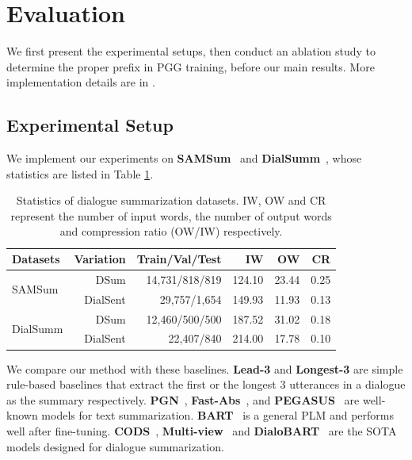 \section{Evaluation}
We first present the experimental setups, then conduct an ablation study to
determine the proper prefix in PGG training, before our main 
results. More implementation details are in .

\subsection{Experimental Setup}
We implement our experiments on \textbf{SAMSum}~\cite{gliwa2019samsum}
and  \textbf{DialSumm}~\cite{chen-etal-2021-dialogsum}, whose statistics 
are listed in Table \ref{tab:sumdataset}. 



\begin{table}[th]
	\scriptsize
	\centering
	\begin{tabular}{p{0.8cm}rrrrr}
		\toprule[1pt]
		\textbf{Datasets}& \textbf{Variation} & \textbf{Train/Val/Test} & \textbf{IW} & \textbf{OW} & \textbf{CR} \\
		\midrule[1pt]
		\multirow{2}{*}{SAMSum}& DSum & 14,731/818/819 & 124.10 & 23.44 & 0.25\\
		&DialSent& 29,757/1,654  & 149.93 & 11.93 & 0.13\\
		\multirow{2}{*}{DialSumm} & DSum & 12,460/500/500 & 187.52 & 31.02 & 0.18 \\
		& DialSent&22,407/840  &214.00 & 17.78 & 0.10 \\
		\bottomrule[1pt]
	\end{tabular}
	\caption{Statistics of dialogue summarization datasets. IW, OW and CR represent the number of input words, the number of output words and compression ratio (OW/IW) respectively.}
	\label{tab:sumdataset}
\end{table}

We compare our method with these baselines.
\textbf{Lead-3} and \textbf{Longest-3} are simple rule-based 
baselines that extract the first or the longest $3$ utterances in 
a dialogue as the summary respectively. 
\textbf{PGN}~\cite{see2017get}, \textbf{Fast-Abs}~\cite{chen2018fast}, and \textbf{PEGASUS}~\cite{zhang2020pegasus} are well-known models for text summarization. \textbf{BART}~\cite{lewis2020bart} is a general PLM and performs well after fine-tuning.
\textbf{CODS}~\cite{wu-etal-2021-controllable}, \textbf{Multi-view}~\cite{chen2020multi} and \textbf{DialoBART}~\cite{feng-etal-2021-language} are the SOTA models designed for dialogue summarization.

